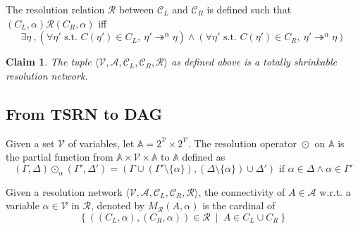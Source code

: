 \documentclass{article}
\newtheorem{claim}{Claim}
\newcommand{\parts}[1]{2^{#1}}
\newcommand{\ens}[2]{\left\{ #1 ~ \middle| ~ #2 \right\}}
\newcommand{\varSet}{\mathcal{V}}
\newcommand{\axiomSet}{\mathcal{A}}
\newcommand{\conSet}{\mathcal{C}}
\newcommand{\resoSet}{\mathcal{R}}
\newcommand{\node}{\eta}
\newcommand{\conc}[1]{C\left(#1\right)}
\newcommand{\dual}[1]{\overline{#1}}
\newcommand{\treach}[3]{#1 \twoheadrightarrow^{#2} #3}
\newcommand{\reso}[1]{\odot_{#1}}
\newcommand{\ncon}[3]{M_{#3} \left( #1 , #2 \right)}
\begin{document}
The resolution relation $\resoSet$ between $\conSet_L$ and $\conSet_R$ is defined such that
$(C_L,\alpha) \resoSet (C_R,\alpha)$ iff
$$
  \exists \node ~,
    \left( \forall \node' \text{ s.t. } \conc{\node'} \in C_L ,~
              \treach{\node'}{\dual{\alpha}}{\node} \right) \wedge
    \left( \forall \node' \text{ s.t. } \conc{\node'} \in C_R ,~
              \treach{\node'}{\alpha}{\node} \right)
$$

\begin{claim}
The tuple $\langle \varSet, \axiomSet, \conSet_L, \conSet_R, \resoSet \rangle$ as defined above is a
totally shrinkable resolution network.
\end{claim}



\subsection{From TSRN to DAG}

Given a set $\varSet$ of variables, let $\mathbb{A} = \parts{\varSet} \times \parts{\varSet}$. The
resolution operator $\reso{}$ on $\mathbb{A}$ is the partial function from $\mathbb{A} \times \varSet
\times \mathbb{A}$ to $\mathbb{A}$ defined as
$$
  (\Gamma,\Delta) \reso{\alpha} (\Gamma',\Delta') =
    (\Gamma \cup (\Gamma' \setminus \{\alpha\}),
     (\Delta \setminus \{\alpha\}) \cup \Delta')
  \text{ if } \alpha \in \Delta \wedge \alpha \in \Gamma'
$$

Given a resolution network $\langle \varSet, \axiomSet, \conSet_L, \conSet_R, \resoSet \rangle$, 
the connectivity of $A \in \axiomSet$ w.r.t. a variable $\alpha \in \varSet$ in $\resoSet$, denoted
by $\ncon{A}{\alpha}{\resoSet}$ is the cardinal of
$$\ens{((C_L,\alpha),(C_R,\alpha)) \in \resoSet}{A \in C_L \cup C_R}$$
\end{document}
